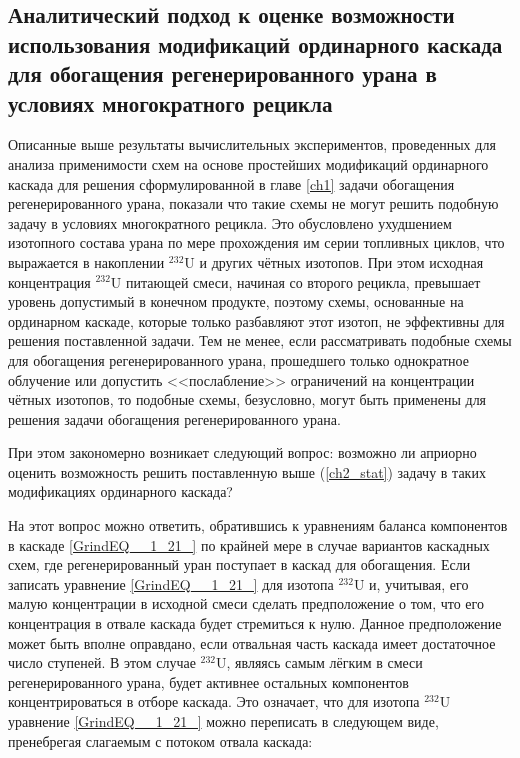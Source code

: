 \subsection{Аналитический подход к оценке возможности использования модификаций ординарного каскада для обогащения регенерированного урана в условиях многократного рецикла}

Описанные выше результаты вычислительных экспериментов, проведенных для анализа применимости схем на основе простейших модификаций ординарного каскада для решения сформулированной в главе \ref{ch1} задачи обогащения регенерированного урана, показали что такие схемы не могут решить подобную задачу в условиях  многократного рецикла. Это обусловлено ухудшением изотопного состава урана по мере прохождения им серии топливных циклов, что выражается в накоплении $^{232}$U и других чётных изотопов. При этом исходная концентрация $^{232}$U питающей смеси, начиная со второго рецикла, превышает уровень допустимый в конечном продукте, поэтому схемы, основанные на ординарном каскаде, которые только разбавляют этот изотоп, не эффективны для решения поставленной задачи. Тем не менее, если рассматривать подобные схемы для обогащения регенерированного урана, прошедшего только однократное облучение или допустить <<послабление>> ограничений на концентрации чётных изотопов, то подобные схемы, безусловно, могут быть применены для решения задачи обогащения регенерированного урана.

При этом закономерно возникает следующий вопрос: возможно ли априорно оценить возможность решить поставленную выше (\ref{ch2_stat}) задачу в таких модификациях ординарного каскада? 

На этот вопрос можно ответить, обратившись к уравнениям баланса компонентов в каскаде \ref{GrindEQ__1_21_} по крайней мере в случае вариантов каскадных схем, где регенерированный уран поступает в каскад для обогащения. Если записать уравнение \ref{GrindEQ__1_21_} для изотопа $^{232}$U и, учитывая, его малую концентрации в исходной смеси сделать предположение о том, что его концентрация в отвале каскада будет стремиться к нулю. Данное предположение может быть вполне оправдано, если отвальная часть каскада имеет достаточное число ступеней. В этом случае $^{232}$U, являясь самым лёгким в смеси регенерированного урана, будет активнее остальных компонентов концентрироваться в отборе каскада. Это означает, что для изотопа $^{232}$U уравнение \ref{GrindEQ__1_21_} можно переписать в следующем виде, пренебрегая слагаемым с потоком отвала каскада:

